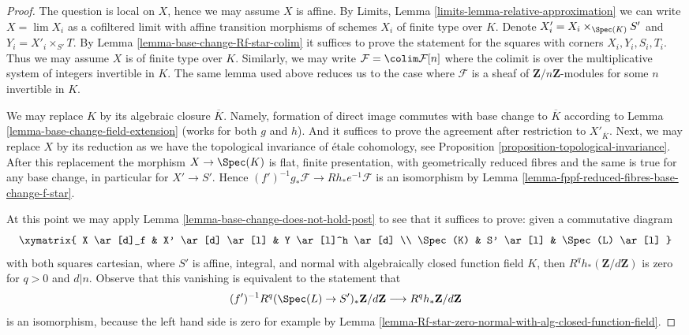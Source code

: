 \begin{proof}
The question is local on $X$, hence we may assume $X$ is affine.
By Limits, Lemma \ref{limits-lemma-relative-approximation}
we can write $X = \lim X_i$ as a cofiltered limit with affine
transition morphisms of schemes $X_i$ of finite type over $K$.
Denote $X'_i =  X_i \times_{\Spec(K)} S'$ and $Y_i = X'_i \times_{S'} T$.
By Lemma \ref{lemma-base-change-Rf-star-colim}
it suffices to prove the statement for the squares
with corners $X_i, Y_i, S_i, T_i$.
Thus we may assume $X$ is of finite type over $K$.
Similarly, we may write
$\mathcal{F} = \colim \mathcal{F}[n]$ where the colimit
is over the multiplicative system of integers invertible in $K$.
The same lemma used above reduces us to the case where
$\mathcal{F}$ is a sheaf of $\mathbf{Z}/n\mathbf{Z}$-modules
for some $n$ invertible in $K$.

\medskip\noindent
We may replace $K$ by its algebraic closure $\overline{K}$.
Namely, formation of direct image commutes with base change
to $\overline{K}$ according to
Lemma \ref{lemma-base-change-field-extension} (works for both
$g$ and $h$). And it suffices to prove the agreement after
restriction to $X'_{\overline{K}}$. Next, we may replace
$X$ by its reduction as we have the topological invariance of \'etale
cohomology, see
Proposition \ref{proposition-topological-invariance}.
After this replacement the morphism $X \to \Spec(K)$
is flat, finite presentation, with geometrically reduced fibres
and the same is true for any base change, in particular for $X' \to S'$.
Hence $(f')^{-1}g_*\mathcal{F} \to Rh_*e^{-1}\mathcal{F}$
is an isomorphism by Lemma \ref{lemma-fppf-reduced-fibres-base-change-f-star}.

\medskip\noindent
At this point we may apply
Lemma \ref{lemma-base-change-does-not-hold-post}
to see that it suffices to prove: given a commutative diagram
$$
\xymatrix{
X \ar[d]_f & X' \ar[d] \ar[l] & Y \ar[l]^h \ar[d] \\
\Spec(K) & S' \ar[l] & \Spec(L) \ar[l]
}
$$
with both squares cartesian, where $S'$ is affine, integral, and normal
with algebraically closed function field $K$, then
$R^qh_*(\mathbf{Z}/d\mathbf{Z})$ is zero for $q > 0$ and $d | n$.
Observe that this vanishing is equivalent to the statement that
$$
(f')^{-1}R^q(\Spec(L) \to S')_*\mathbf{Z}/d\mathbf{Z}
\longrightarrow
R^qh_*\mathbf{Z}/d\mathbf{Z}
$$
is an isomorphism, because the left hand side is zero for example by
Lemma \ref{lemma-Rf-star-zero-normal-with-alg-closed-function-field}.


\end{proof}
